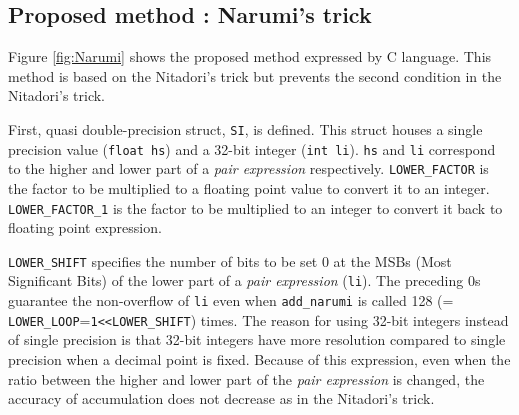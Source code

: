 \subsection{Proposed method : Narumi's trick}

Figure \ref{fig:Narumi} shows the proposed method expressed by C language.
This method is based on the Nitadori's trick but 
prevents the second condition in the Nitadori's trick.

First, quasi double-precision struct, {\tt SI}, is defined. This struct houses
a single precision value ({\tt float hs}) and a 32-bit integer ({\tt int li}).
{\tt hs} and {\tt li} correspond to the higher and lower part of a {\it pair
expression} respectively.
{\tt LOWER\_FACTOR} is the factor to be multiplied to a floating point
value to convert it to an integer.
{\tt LOWER\_FACTOR\_1} is the factor to be multiplied to an integer
to convert it back to floating point expression.

{\tt LOWER\_SHIFT} specifies the number of bits to be set 0 at
the MSBs (Most Significant Bits) of the lower part of a {\it pair
expression} ({\tt li}). The preceding 0s guarantee the non-overflow of
{\tt li} even when {\tt add\_narumi} is called 128 (={\tt
  LOWER\_LOOP}={\tt 1<<LOWER\_SHIFT}) times. The reason for
using 32-bit integers instead of single precision is that 32-bit
integers have more resolution compared to single precision when a
decimal point is fixed. Because of this expression, even when the
ratio between the higher and lower part of the {\it pair expression} is
changed, the accuracy of accumulation does not decrease as in the
Nitadori's trick.

